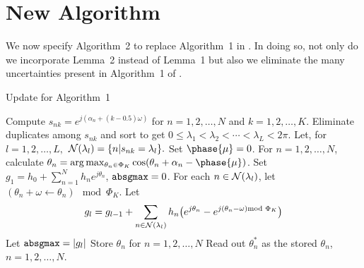 %
\section{New Algorithm}
%
We now specify Algorithm~2 to replace Algorithm~1 in \cite{b1}. In
doing so, not only do we incorporate Lemma~2 instead of Lemma~1 but
also we eliminate the many uncertainties present in Algorithm~1 of
\cite{b1}.

\setcounter{algorithm}{1}
\begin{algorithm}
\caption{Update for Algorithm~1}\label{alg:alg2}
\begin{algorithmic}[1]
 Compute %
$s_{nk}=e^{j(\alpha_n + (k -0.5)\omega)}$ for $n=1,2,\ldots,N$ and
$k=1,2,\ldots,K$.
\State Eliminate duplicates among $s_{nk}$ and sort to get
$0\le \lambda_1 < \lambda_2 < \cdots < \lambda_L < 2\pi.$
\State Let, for $l = 1,2,\ldots,L,$ ${\cal N} (\lambda_l) =
\{ n | s_{nk} = \lambda_l \}.$
\State %
Set $\phase{\mu} = 0$. For $n=1,2,\ldots,N$, calculate
$\theta_n = \arg\max_{\theta_n\in\Phi_K} \cos(\theta_n + \alpha_n - \phase{\mu})$.
\State Set $g_1 = h_0 + \sum_{n=1}^N h_ne^{j\theta_n}$, ${\tt absgmax} = 0$.
\State For each $n\in{\cal N}(\lambda_l)$, let $(\theta_n + \omega \leftarrow \theta_n) \!\! \mod \Phi_K$.
\State Let
\[
g_l = g_{l-1} + \sum_{n\in {\cal N}(\lambda_l)} h_n \big(e^{j\theta_n} - e^{j(\theta_n - \omega) \!\!\!\! \mod \Phi_K}\big)
\]
\State Let ${\tt absgmax} = |g_l|$
\State Store $\theta_n$ for $n=1,2,\ldots,N$
\EndIf
\EndFor
\State Read out $\theta_n^*$ as the stored $\theta_n$, $n=1,2,\ldots,N$.
\end{algorithmic}
\end{algorithm} 